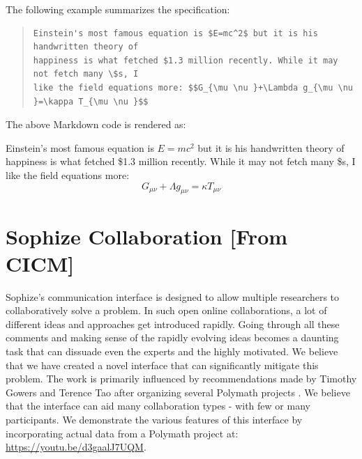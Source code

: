 \documentclass[a4paper]{article}
\begin{document}
The following example summarizes the specification:
\begin{quote}
\begin{verbatim} 
Einstein's most famous equation is $E=mc^2$ but it is his handwritten theory of 
happiness is what fetched $1.3 million recently. While it may not fetch many \$s, I 
like the field equations more: $$G_{\mu \nu }+\Lambda g_{\mu \nu }=\kappa T_{\mu \nu }$$
\end{verbatim}
\end{quote}


The above Markdown code is rendered as:
\begin{mdframed}
Einstein's most famous equation is $E=mc^2$ but it is his handwritten theory of happiness is
what fetched \$1.3 million recently. While it may not fetch many \$s, I like the field
equations more: $$G_{\mu \nu }+\Lambda g_{\mu \nu }=\kappa T_{\mu \nu }$$
\end{mdframed}

\section{Sophize Collaboration [From CICM]}

Sophize's communication interface is designed to allow multiple researchers to collaboratively solve a problem. In such open online collaborations, a lot of different ideas and approaches get introduced rapidly. Going through all these comments and making sense of the rapidly evolving ideas becomes a daunting task that can dissuade even the experts and the highly motivated. We believe that we have created a novel interface that can significantly mitigate this problem. The work is primarily influenced by recommendations made by Timothy Gowers and Terence Tao after organizing several Polymath projects \cite{polymath_blog}. We believe that the interface can aid many collaboration types - with few or many participants. We demonstrate the various features of this interface by incorporating actual data from a Polymath project at: \url{https://youtu.be/d3gaalJ7UQM}.
\end{document}
